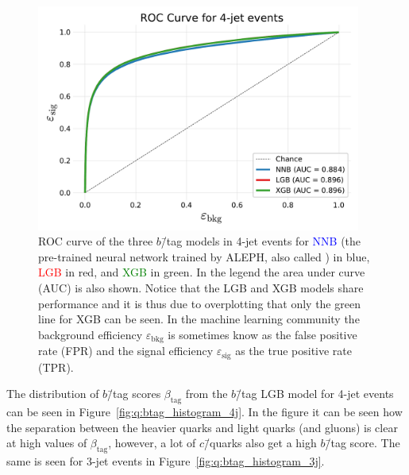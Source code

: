 \begin{figure}[h!]
  \centerfloat
  \includegraphics[width=0.95\textwidth, trim=10 10 10 40, clip]{figures/quarks/ROC_4_jet-down_sample=1.00-ML_vars=vertex-selection=b-ejet_min=4-n_iter_RS_lgb=99-n_iter_RS_xgb=9-cdot_cut=0.90-version=19.pdf}
  \caption[ROC curve for 4-jet $b$\=/tagging]
          {ROC curve of the three $b$\=/tag models in 4-jet events for \textcolor{blue}{NNB} (the pre-trained neural network trained by ALEPH, also called ) in blue, \textcolor{red}{LGB} in red, and \textcolor{green}{XGB} in green. In the legend the area under curve (AUC) is also shown. Notice that the LGB and XGB models share performance and it is thus due to overplotting that only the green line for XGB can be seen. In the machine learning community the background efficiency $\varepsilon_\mathrm{bkg}$ is sometimes know as the false positive rate (FPR) and the signal efficiency $\varepsilon_\mathrm{sig}$ as the true positive rate (TPR).  
          } 
  \label{fig:q:roc_btag_4j}
\end{figure}

The distribution of $b$\=/tag scores $\beta_\mathrm{tag}$ from the $b$\=/tag LGB model for 4-jet events can be seen in Figure~\ref{fig:q:btag_histogram_4j}. In the figure it can be seen how the separation between the heavier quarks and light quarks (and gluons) is clear at high values of $\beta_\mathrm{tag}$, however, a lot of $c$\=/quarks also get a high $b$\=/tag score. The same is seen for 3-jet events in Figure~\ref{fig:q:btag_histogram_3j}. 


